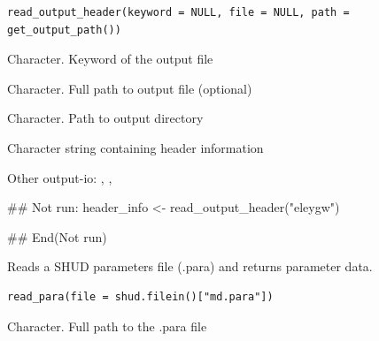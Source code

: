 \documentclass[a4paper]{book}
\begin{document}
%
\begin{Usage}
\begin{verbatim}
read_output_header(keyword = NULL, file = NULL, path = get_output_path())
\end{verbatim}
\end{Usage}
%
\begin{Arguments}
\begin{ldescription}
\item[\code{keyword}] Character. Keyword of the output file

\item[\code{file}] Character. Full path to output file (optional)

\item[\code{path}] Character. Path to output directory
\end{ldescription}
\end{Arguments}
%
\begin{Value}
Character string containing header information
\end{Value}
%
\begin{SeeAlso}\relax
Other output-io: 
,
,
\end{SeeAlso}
%
\begin{Examples}
\begin{ExampleCode}
## Not run: 
header_info <- read_output_header("eleygw")

## End(Not run)
\end{ExampleCode}
\end{Examples}
%
\begin{Description}\relax
Reads a SHUD parameters file (.para) and returns parameter data.
\end{Description}
%
\begin{Usage}
\begin{verbatim}
read_para(file = shud.filein()["md.para"])
\end{verbatim}
\end{Usage}
%
\begin{Arguments}
\begin{ldescription}
\item[\code{file}] Character. Full path to the .para file
\end{ldescription}
\end{Arguments}
\end{document}
